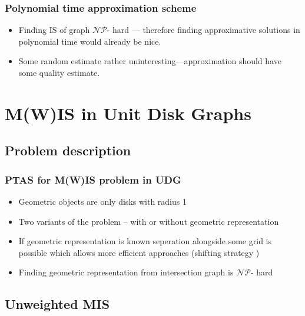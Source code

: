 \documentclass{beamer}
\newcommand{\NP}{\ensuremath{\mathcal{NP}}}
\begin{document}
\begin{frame}
\frametitle{Polynomial time approximation scheme}
\begin{itemize}
\item<1-> Finding IS of graph \NP - hard --- therefore finding approximative solutions in polynomial time would already be nice.
\item<1-> Some random estimate rather uninteresting---approximation should have some quality estimate.
\end{itemize}
\end{frame}


\section{M(W)IS in Unit Disk Graphs}
\subsection{Problem description}
\begin{frame}
\frametitle{PTAS for M(W)IS problem in UDG \cite{nieberg}}
\begin{itemize}
\item Geometric objects are only disks with radius 1
\item Two variants of the problem -- with or without geometric representation
\item If geometric representation is known seperation alongside some grid is possible which allows more efficient approaches (shifting strategy \cite{fonseca})
\item Finding geometric representation from intersection graph is \NP- hard \cite{nphard}
\end{itemize}
\end{frame}
\subsection{Unweighted MIS}
\end{document}
